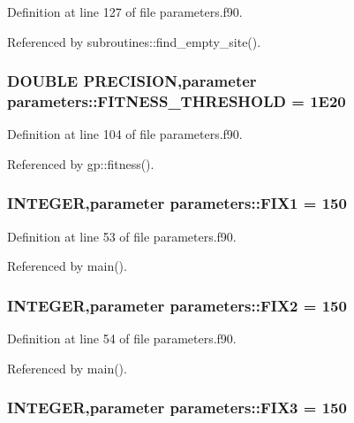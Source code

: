 Definition at line 127 of file parameters.f90.

Referenced by subroutines::find\_\-empty\_\-site().\hypertarget{namespaceparameters_af6f041d5b1d3325bec07e87ac32f3a2e}{
\subsubsection[{FITNESS\_\-THRESHOLD}]{\setlength{\rightskip}{0pt plus 5cm}DOUBLE PRECISION,parameter {\bf parameters::FITNESS\_\-THRESHOLD} = 1E20}}
\label{namespaceparameters_af6f041d5b1d3325bec07e87ac32f3a2e}


Definition at line 104 of file parameters.f90.

Referenced by gp::fitness().\hypertarget{namespaceparameters_a2fbeb743f79ed8a1c34482eb24ce3e87}{
\subsubsection[{FIX1}]{\setlength{\rightskip}{0pt plus 5cm}INTEGER,parameter {\bf parameters::FIX1} = 150}}
\label{namespaceparameters_a2fbeb743f79ed8a1c34482eb24ce3e87}


Definition at line 53 of file parameters.f90.

Referenced by main().\hypertarget{namespaceparameters_a11cddb5a155baade8a969acb80c17292}{
\subsubsection[{FIX2}]{\setlength{\rightskip}{0pt plus 5cm}INTEGER,parameter {\bf parameters::FIX2} = 150}}
\label{namespaceparameters_a11cddb5a155baade8a969acb80c17292}


Definition at line 54 of file parameters.f90.

Referenced by main().\hypertarget{namespaceparameters_adedf5e0e6373ffbf611e8767d9cf0e80}{
\subsubsection[{FIX3}]{\setlength{\rightskip}{0pt plus 5cm}INTEGER,parameter {\bf parameters::FIX3} = 150}}
\label{namespaceparameters_adedf5e0e6373ffbf611e8767d9cf0e80}


